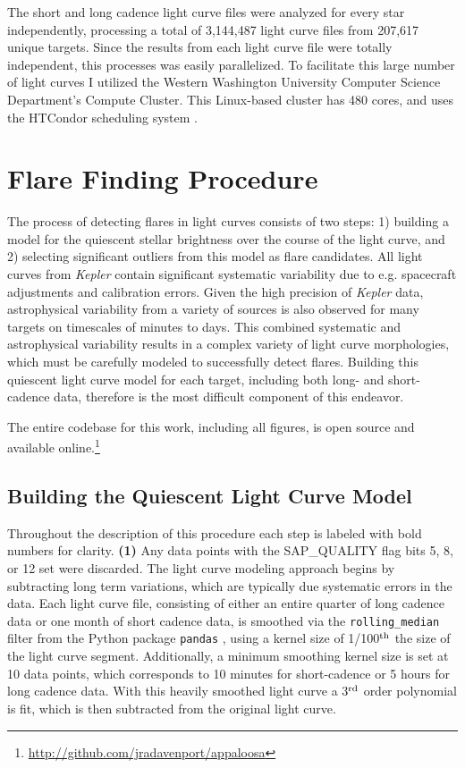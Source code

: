 \documentclass[twocolumn]{aastex6}
\newcommand{\Kepler}{\textsl{Kepler}\xspace}
\begin{document}
The short and long cadence light curve files were analyzed for every star independently, processing a total of 3,144,487 light curve files from 207,617 unique targets. Since the results from each light curve file were totally independent, this processes was easily parallelized. To facilitate this large number of light curves I utilized the Western Washington University Computer Science Department's Compute Cluster. This Linux-based cluster has 480 cores, and uses the HTCondor scheduling system \citep{condor-hunter,condor-practice}.




\section{Flare Finding Procedure}
\label{sec:find}

The process of detecting flares in light curves consists of two steps: 1) building a model for the quiescent stellar brightness over the course of the light curve, and 2) selecting significant outliers from this model as flare candidates. All light curves from \Kepler contain significant systematic variability due to e.g. spacecraft adjustments and calibration errors. Given the high precision of \Kepler data, astrophysical variability from a variety of sources is also observed for many targets on timescales of minutes to days. This combined systematic and astrophysical variability results in a complex variety of light curve morphologies, which must be carefully modeled to successfully detect flares. Building this quiescent light curve model for each target, including both long- and short-cadence data, therefore is the most difficult component of this endeavor.

The entire codebase for this work, including all figures, is open source and available online.\footnote{\url{http://github.com/jradavenport/appaloosa}}


\subsection{Building the Quiescent Light Curve Model}
\label{sec:find1}
Throughout the description of this procedure each step is labeled with bold numbers for clarity.
{\bf (1)} Any data points with the SAP\_QUALITY flag bits 5, 8, or 12 set were discarded. The light curve modeling approach begins by subtracting long term variations, which are typically due systematic errors in the data. Each light curve file, consisting of either an entire quarter of long cadence data or one month of short cadence data, is smoothed via the {\tt rolling\_median} filter from the Python package {\tt pandas} \citep{pandas}, using a kernel size of 1/100$^{\rm th}$ the size of the light curve segment. Additionally, a minimum smoothing kernel size is set at 10 data points, which corresponds to 10 minutes for short-cadence or 5 hours for long cadence data. With this heavily smoothed light curve a 3$^{\rm rd}$ order polynomial is fit, which is then subtracted from the original light curve.
\end{document}
